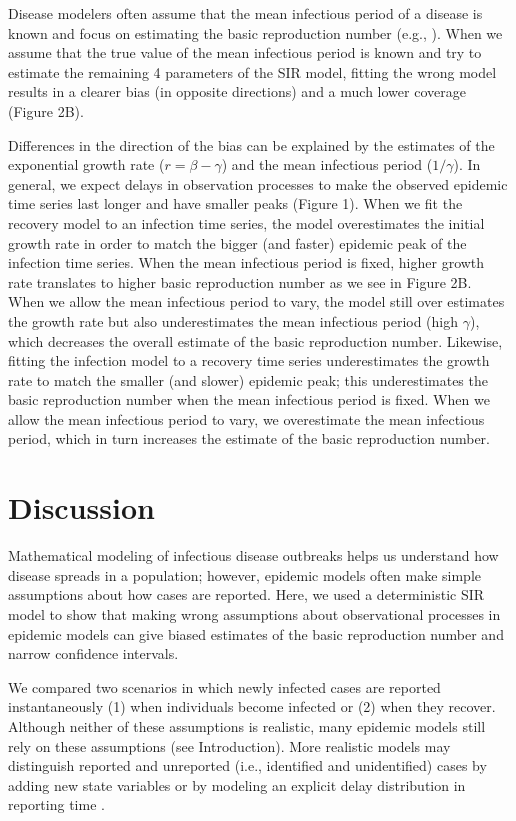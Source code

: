 \documentclass[12pt]{article}\usepackage[]{graphicx}\usepackage[]{color}
\begin{document}
Disease modelers often assume that the mean infectious period of a disease
is known and focus on estimating the basic reproduction number (e.g.,
\cite{hooker2010parameterizing, lin2016seasonality, pons2018serotype}). 
When we assume that the true value of the mean infectious period is known
and try to estimate the remaining 4 parameters of the SIR model, fitting the
wrong model results in a clearer bias (in opposite directions) 
and a much lower coverage (Figure 2B).

Differences in the direction of the bias can be explained by the estimates of the
exponential growth rate ($r = \beta - \gamma$) and the mean infectious period ($1/\gamma$).
In general, we expect delays in observation processes to make the observed epidemic 
time series last longer and have smaller peaks (Figure 1).
When we fit the recovery model to an infection time series, the model overestimates
the initial growth rate in order to match the bigger (and faster) epidemic peak of the 
infection time series. When the mean infectious period is fixed, higher growth rate
translates to higher basic reproduction number as we see in Figure 2B. When we allow
the mean infectious period to vary, the model still over estimates the growth rate but
also underestimates the mean infectious period (high $\gamma$), 
which decreases the overall estimate of the basic reproduction number.
Likewise, fitting the infection model to a recovery time series underestimates
the growth rate to match the smaller (and slower) epidemic peak; this 
underestimates the basic reproduction number when the mean infectious period is fixed. 
When we allow the mean infectious period to vary, we overestimate the mean infectious
period, which in turn increases the estimate of the basic reproduction number.

\section{Discussion}

Mathematical modeling of infectious disease outbreaks helps us understand 
how disease spreads in a population; however, epidemic models often make 
simple assumptions about how cases are reported. 
Here, we used a deterministic SIR model to show that 
making wrong assumptions about observational processes in epidemic models
can give biased estimates of the basic reproduction number and narrow
confidence intervals.

We compared two scenarios in which newly infected cases are reported 
instantaneously (1) when individuals become infected or
(2) when they recover. Although neither of these
assumptions is realistic, many epidemic models still rely on these
assumptions (see Introduction). 
More realistic models may distinguish reported and unreported
(i.e., identified and unidentified) cases by adding
new state variables \citep{browne2015modeling,webb2015model} 
or by modeling an explicit delay distribution in reporting time 
\citep{harris1990reporting, ferguson2001foot, goldstein2009reconstructing,
ster2009epidemiological, birrell2011bayesian, funk2018real}.
\end{document}
